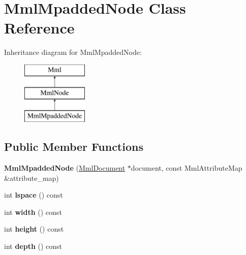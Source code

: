 \hypertarget{class_mml_mpadded_node}{}\section{Mml\+Mpadded\+Node Class Reference}
\label{class_mml_mpadded_node}
Inheritance diagram for Mml\+Mpadded\+Node\+:\begin{figure}[H]
\begin{center}
\leavevmode
\includegraphics[height=3.000000cm]{class_mml_mpadded_node}
\end{center}
\end{figure}
\subsection*{Public Member Functions}
\begin{DoxyCompactItemize}
\item 
\mbox{\label{class_mml_mpadded_node_a8f54b17f17ff729ae40ee3040e2e2eed}} 
{\bfseries Mml\+Mpadded\+Node} (\mbox{\hyperlink{class_mml_document}{Mml\+Document}} $\ast$document, const Mml\+Attribute\+Map \&attribute\+\_\+map)
\item 
\mbox{\label{class_mml_mpadded_node_a0b8b2aa151c1ac014268cda29440f381}} 
int {\bfseries lspace} () const
\item 
\mbox{\label{class_mml_mpadded_node_a6c845a6b56b91c2ff1598e025a5a6134}} 
int {\bfseries width} () const
\item 
\mbox{\label{class_mml_mpadded_node_ac877bf7afc8bd3086d28ea72513fbefd}} 
int {\bfseries height} () const
\item 
\mbox{\label{class_mml_mpadded_node_a3887e35220e98e802e252de2252b90b9}} 
int {\bfseries depth} () const
\end{DoxyCompactItemize}
